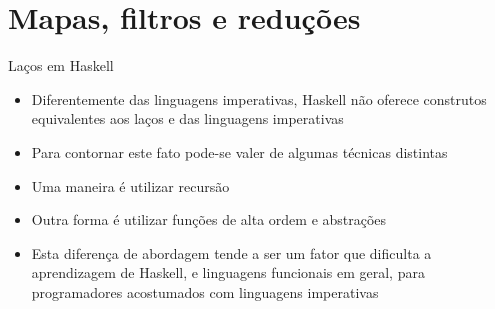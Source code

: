 \section{Mapas, filtros e reduções}

\begin{frame}[fragile]{Laços em Haskell}

    \begin{itemize}
        \item Diferentemente das linguagens imperativas, Haskell não oferece construtos equivalentes
            aos laços  e  das linguagens imperativas

        \item Para contornar este fato pode-se valer de algumas técnicas distintas

        \item Uma maneira é utilizar recursão

        \item Outra forma é utilizar funções de alta ordem e abstrações

        \item Esta diferença de abordagem tende a ser um fator que dificulta a 
            aprendizagem de Haskell, e linguagens funcionais em geral, para programadores
            acostumados com linguagens imperativas

    \end{itemize}

\end{frame}
